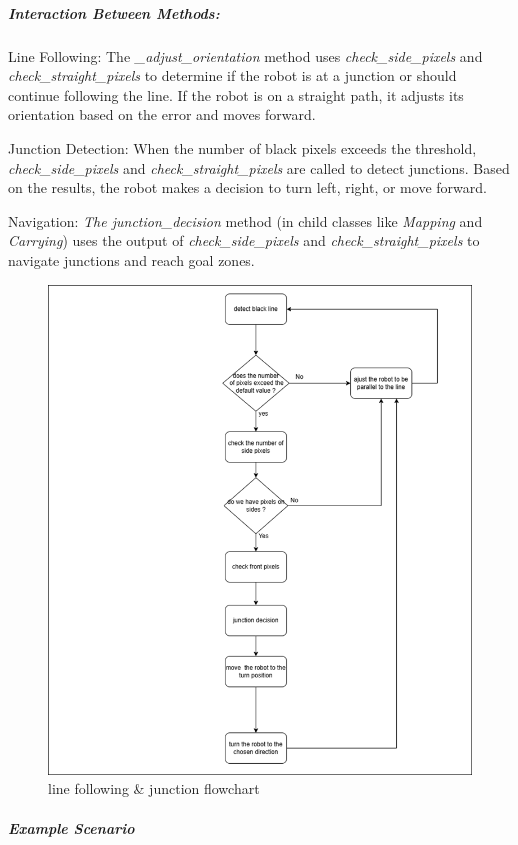 \documentclass[../../main]{subfiles}
\begin{document}
\subparagraph{Interaction Between Methods:}
Line Following: The \emph{\_adjust\_orientation} method uses
\emph{check\_side\_pixels} and \emph{check\_straight\_pixels} to
determine if the robot is at a junction or should continue following the
line. If the robot is on a straight path, it adjusts its orientation
based on the error and moves forward.

Junction Detection: When the number of black pixels exceeds the
threshold,\\ \emph{check\_side\_pixels} and \emph{check\_straight\_pixels}
are called to detect junctions. Based on the results, the robot makes a
decision to turn left, right, or move forward.

Navigation: \emph{The junction\_decision} method (in child classes like
\emph{Mapping} and \emph{Carrying}) uses the output of
\emph{check\_side\_pixels} and \emph{check\_straight\_pixels} to
navigate junctions and reach goal zones.


\begin{figure}
\centering
\includegraphics[width=\textwidth]{img/image043.png}
\caption{line following \& junction flowchart}
\label{judeFig31}
\end{figure}
\newpage
\subparagraph{Example Scenario}
\end{document}
